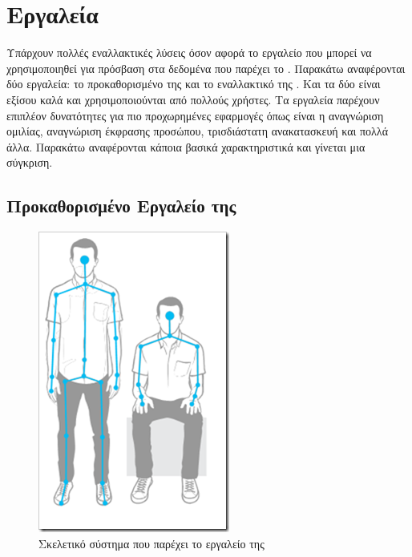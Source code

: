 \section{Εργαλεία}

Υπάρχουν πολλές εναλλακτικές λύσεις όσον αφορά το εργαλείο που μπορεί να χρησιμοποιηθεί για πρόσβαση στα δεδομένα που παρέχει το . Παρακάτω αναφέρονται δύο εργαλεία: το προκαθορισμένο  της  και το εναλλακτικό της . Και τα δύο είναι εξίσου καλά και χρησιμοποιούνται από πολλούς χρήστες. Τα εργαλεία παρέχουν επιπλέον δυνατότητες για πιο προχωρημένες εφαρμογές όπως είναι η αναγνώριση ομιλίας, αναγνώριση έκφρασης προσώπου, τρισδιάστατη ανακατασκευή και πολλά άλλα. Παρακάτω αναφέρονται κάποια βασικά χαρακτηριστικά και γίνεται μια σύγκριση.

\subsection{\texorpdfstring{Προκαθορισμένο Εργαλείο της }{}}

\begin{figure}[H]
    \centering
    \includegraphics[height=.30\textheight, keepaspectratio]{fig/microsoft-skeleton.png}
    \caption{Σκελετικό σύστημα που παρέχει το εργαλείο της \protect\footnotemark}
    \label{fig:microsoft-sdk-skeleton}
\end{figure}

